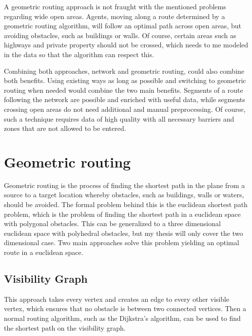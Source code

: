 \documentclass[
	a4paper,
	11pt,
	twoside,
	twocolumn
]{article}
\begin{document}
		A geometric routing approach is not fraught with the mentioned problems regarding wide open areas.
		Agents, moving along a route determined by a geometric routing algorithm, will follow an optimal path across open areas, but avoiding obstacles, such as buildings or walls.
		Of course, certain areas such as highways and private property should not be crossed, which needs to me modeled in the data so that the algorithm can respect this.
		
		Combining both approaches, network and geometric routing, could also combine both benefits.
		Using existing ways as long as possible and switching to geometric routing when needed would combine the two main benefits.
		Segments of a route following the network are possible and enriched with useful data, while segments crossing open areas do not need additional and manual preprocessing.
		Of course, such a technique requires data of high quality with all necessary barriers and zones that are not allowed to be entered.
		
	\section{Geometric routing}
	
		Geometric routing is the process of finding the shortest path in the plane from a source to a target location whereby obstacles, such as buildings, walls or waters, should be avoided.
		The formal problem behind this is the euclidean shortest path problem, which is the problem of finding the shortest path in a euclidean space with polygonal obstacles.
		This can be generalized to a three dimensional euclidean space with polyhedral obstacles, but my thesis will only cover the two dimensional case.
		Two main approaches solve this problem yielding an optimal route in a euclidean space.
		
		\subsection{Visibility Graph}
		
			This approach takes every vertex and creates an edge to every other visible vertex, which ensures that no obstacle is between two connected vertices.
			Then a normal routing algorithm, such as the Dijkstra's algorithm, can be used to find the shortest path on the visibility graph.
			
\end{document}
